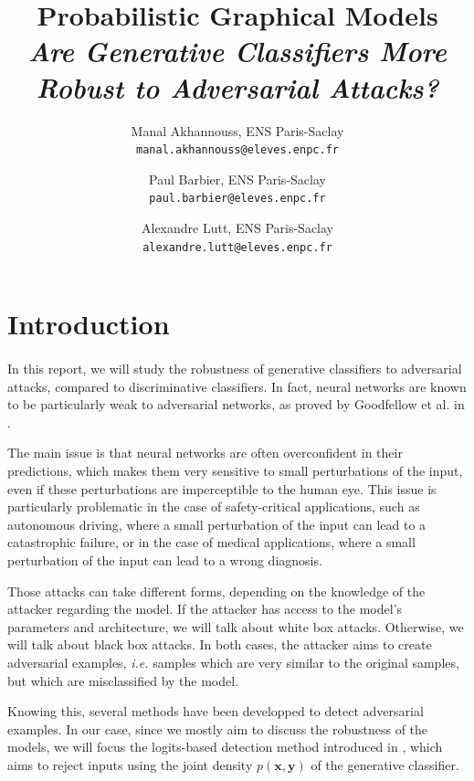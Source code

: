 \documentclass[11pt,twocolumn,letterpaper]{article}
\begin{document}
\title{\LARGE Probabilistic Graphical Models \\ \textit{Are Generative Classiﬁers More Robust to Adversarial Attacks?}}

\author{Manal Akhannouss, ENS Paris-Saclay\\
{\tt\small manal.akhannouss@eleves.enpc.fr}
\and
Paul Barbier, ENS Paris-Saclay\\
{\tt\small paul.barbier@eleves.enpc.fr}
\and
Alexandre Lutt, ENS Paris-Saclay\\
{\tt\small alexandre.lutt@eleves.enpc.fr}
}
\maketitle


\section{Introduction}
\label{sec:intro}

\paragraph{} In this report, we will study the robustness of generative classifiers to adversarial attacks, compared to discriminative classifiers. In fact, neural networks are known to be particularly weak to adversarial networks, as proved by Goodfellow et al. in \cite{fast_gradient_sign}. 
 
The main issue is that neural networks are often overconfident in their predictions, which makes them very sensitive to small perturbations of the input, even if these perturbations are imperceptible to the human eye. This issue is particularly problematic in the case of safety-critical applications, such as autonomous driving, where a small perturbation of the input can lead to a catastrophic failure, or in the case of medical applications, where a small perturbation of the input can lead to a wrong diagnosis. 

Those attacks can take different forms, depending on the knowledge of the attacker regarding the model. If the attacker has access to the model's parameters and architecture, we will talk about white box attacks. Otherwise, we will talk about black box attacks. In both cases, the attacker aims to create adversarial examples, \textit{i.e.} samples which are very similar to the original samples, but which are misclassified by the model. 

Knowing this, several methods have been developped to detect adversarial examples. In our case, since we mostly aim to discuss the robustness of the models, we will focus the logits-based detection method introduced in \cite{main_paper}, which aims to reject inputs using the joint density $p(\bm{x}, \bm{y})$ of the generative classifier.
\end{document}
